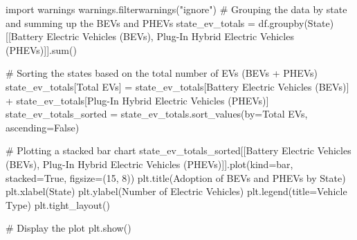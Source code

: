 \documentclass[
  letterpaper,
  DIV=11,
  numbers=noendperiod]{scrartcl}
\newenvironment{Shaded}{\begin{snugshade}}{\end{snugshade}}
\newcommand{\BuiltInTok}[1]{\textcolor[rgb]{0.00,0.23,0.31}{#1}}
\newcommand{\CommentTok}[1]{\textcolor[rgb]{0.37,0.37,0.37}{#1}}
\newcommand{\DecValTok}[1]{\textcolor[rgb]{0.68,0.00,0.00}{#1}}
\newcommand{\ImportTok}[1]{\textcolor[rgb]{0.00,0.46,0.62}{#1}}
\newcommand{\NormalTok}[1]{\textcolor[rgb]{0.00,0.23,0.31}{#1}}
\newcommand{\OperatorTok}[1]{\textcolor[rgb]{0.37,0.37,0.37}{#1}}
\newcommand{\StringTok}[1]{\textcolor[rgb]{0.13,0.47,0.30}{#1}}
\newcommand{\VariableTok}[1]{\textcolor[rgb]{0.07,0.07,0.07}{#1}}
\begin{document}
\begin{Shaded}
\begin{Highlighting}[]
\ImportTok{import}\NormalTok{ warnings}
\NormalTok{warnings.filterwarnings(}\StringTok{"ignore"}\NormalTok{)}
\CommentTok{\# Grouping the data by state and summing up the BEVs and PHEVs}
\NormalTok{state\_ev\_totals }\OperatorTok{=}\NormalTok{ df.groupby(}\StringTok{\textquotesingle{}State\textquotesingle{}}\NormalTok{)[[}\StringTok{\textquotesingle{}Battery Electric Vehicles (BEVs)\textquotesingle{}}\NormalTok{, }\StringTok{\textquotesingle{}Plug{-}In Hybrid Electric Vehicles (PHEVs)\textquotesingle{}}\NormalTok{]].}\BuiltInTok{sum}\NormalTok{()}

\CommentTok{\# Sorting the states based on the total number of EVs (BEVs + PHEVs)}
\NormalTok{state\_ev\_totals[}\StringTok{\textquotesingle{}Total EVs\textquotesingle{}}\NormalTok{] }\OperatorTok{=}\NormalTok{ state\_ev\_totals[}\StringTok{\textquotesingle{}Battery Electric Vehicles (BEVs)\textquotesingle{}}\NormalTok{] }\OperatorTok{+}\NormalTok{ state\_ev\_totals[}\StringTok{\textquotesingle{}Plug{-}In Hybrid Electric Vehicles (PHEVs)\textquotesingle{}}\NormalTok{]}
\NormalTok{state\_ev\_totals\_sorted }\OperatorTok{=}\NormalTok{ state\_ev\_totals.sort\_values(by}\OperatorTok{=}\StringTok{\textquotesingle{}Total EVs\textquotesingle{}}\NormalTok{, ascending}\OperatorTok{=}\VariableTok{False}\NormalTok{)}

\CommentTok{\# Plotting a stacked bar chart}
\NormalTok{state\_ev\_totals\_sorted[[}\StringTok{\textquotesingle{}Battery Electric Vehicles (BEVs)\textquotesingle{}}\NormalTok{, }\StringTok{\textquotesingle{}Plug{-}In Hybrid Electric Vehicles (PHEVs)\textquotesingle{}}\NormalTok{]].plot(kind}\OperatorTok{=}\StringTok{\textquotesingle{}bar\textquotesingle{}}\NormalTok{, stacked}\OperatorTok{=}\VariableTok{True}\NormalTok{, figsize}\OperatorTok{=}\NormalTok{(}\DecValTok{15}\NormalTok{, }\DecValTok{8}\NormalTok{))}
\NormalTok{plt.title(}\StringTok{\textquotesingle{}Adoption of BEVs and PHEVs by State\textquotesingle{}}\NormalTok{)}
\NormalTok{plt.xlabel(}\StringTok{\textquotesingle{}State\textquotesingle{}}\NormalTok{)}
\NormalTok{plt.ylabel(}\StringTok{\textquotesingle{}Number of Electric Vehicles\textquotesingle{}}\NormalTok{)}
\NormalTok{plt.legend(title}\OperatorTok{=}\StringTok{\textquotesingle{}Vehicle Type\textquotesingle{}}\NormalTok{)}
\NormalTok{plt.tight\_layout()}

\CommentTok{\# Display the plot}
\NormalTok{plt.show()}
\end{Highlighting}
\end{Shaded}
\end{document}
